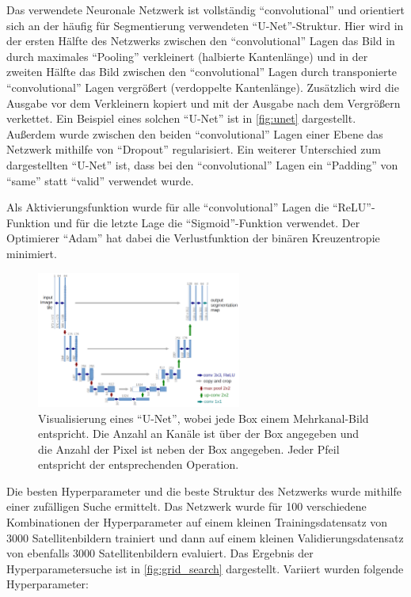 Das verwendete Neuronale Netzwerk ist vollständig \enquote{convolutional} und orientiert sich an der häufig für Segmentierung verwendeten \enquote{U-Net}-Struktur.\cite{ronneberger2015unet}
Hier wird in der ersten Hälfte des Netzwerks zwischen den \enquote{convolutional} Lagen das Bild in durch maximales \enquote{Pooling} verkleinert (halbierte Kantenlänge) 
und in der zweiten Hälfte das Bild zwischen den \enquote{convolutional} Lagen durch transponierte \enquote{convolutional} Lagen vergrößert (verdoppelte Kantenlänge).
Zusätzlich wird die Ausgabe vor dem Verkleinern kopiert und mit der Ausgabe nach dem Vergrößern verkettet.
Ein Beispiel eines solchen \enquote{U-Net} ist in \autoref{fig:unet} dargestellt.
Außerdem wurde zwischen den beiden \enquote{convolutional} Lagen einer Ebene das Netzwerk mithilfe von \enquote{Dropout} regularisiert.
Ein weiterer Unterschied zum dargestellten \enquote{U-Net} ist, dass bei den \enquote{convolutional} Lagen ein \enquote{Padding} von \enquote{same} statt \enquote{valid} verwendet wurde.

Als Aktivierungsfunktion wurde für alle \enquote{convolutional} Lagen die \enquote{ReLU}-Funktion und für die letzte Lage die \enquote{Sigmoid}-Funktion verwendet.
Der Optimierer \enquote{Adam} hat dabei die Verlustfunktion der binären Kreuzentropie minimiert.

\begin{figure}
    \centering
    \includegraphics[width=0.6\textwidth]{images/unet.png}
    \caption{Visualisierung eines \enquote{U-Net}, %
    wobei jede Box einem Mehrkanal-Bild entspricht. Die Anzahl an Kanäle ist über der Box angegeben und die Anzahl der Pixel ist neben der Box angegeben. %
    Jeder Pfeil entspricht der entsprechenden Operation.\cite{ronneberger2015unet}}
    \label{fig:visual_model}
\end{figure}

Die besten Hyperparameter und die beste Struktur des Netzwerks wurde mithilfe einer zufälligen Suche ermittelt.
Das Netzwerk wurde für 100 verschiedene Kombinationen der Hyperparameter auf einem kleinen Trainingsdatensatz von 3000 Satellitenbildern trainiert
und dann auf einem kleinen Validierungsdatensatz von ebenfalls 3000 Satellitenbildern evaluiert.
Das Ergebnis der Hyperparametersuche ist in \autoref{fig:grid_search} dargestellt.
Variiert wurden folgende Hyperparameter:

